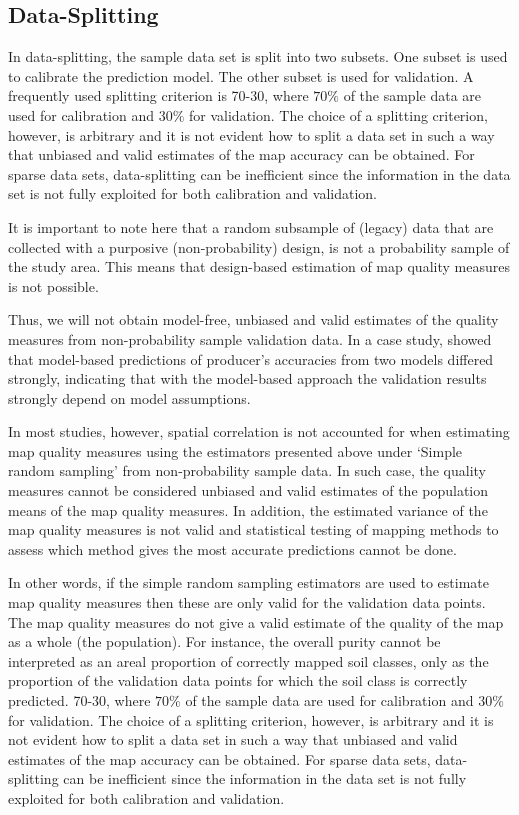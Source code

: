 \documentclass[10pt,b5paper,]{book}
\theoremstyle{definition}
\theoremstyle{definition}
\theoremstyle{definition}
\theoremstyle{remark}
\begin{document}
\hypertarget{data-splitting}{%
\subsection{Data-Splitting}\label{data-splitting}}

In data-splitting, the sample data set is split into two subsets. One
subset is used to calibrate the prediction model. The other subset is
used for validation. A frequently used splitting criterion is 70-30,
where \(70\%\) of the sample data are used for calibration and \(30\%\)
for validation. The choice of a splitting criterion, however, is
arbitrary and it is not evident how to split a data set in such a way
that unbiased and valid estimates of the map accuracy can be obtained.
For sparse data sets, data-splitting can be inefficient since the
information in the data set is not fully exploited for both calibration
and validation.

It is important to note here that a random subsample of (legacy) data
that are collected with a purposive (non-probability) design, is not a
probability sample of the study area. This means that design-based
estimation of map quality measures is not possible.

Thus, we will not obtain model-free, unbiased and valid estimates of the
quality measures from non-probability sample validation data. In a case
study, \citet{knotters2013purposive} showed that model-based predictions
of producer's accuracies from two models differed strongly, indicating
that with the model-based approach the validation results strongly
depend on model assumptions.

In most studies, however, spatial correlation is not accounted for when
estimating map quality measures using the estimators presented above
under `Simple random sampling' from non-probability sample data. In such
case, the quality measures cannot be considered unbiased and valid
estimates of the population means of the map quality measures. In
addition, the estimated variance of the map quality measures is not
valid and statistical testing of mapping methods to assess which method
gives the most accurate predictions cannot be done.

In other words, if the simple random sampling estimators are used to
estimate map quality measures then these are only valid for the
validation data points. The map quality measures do not give a valid
estimate of the quality of the map as a whole (the population). For
instance, the overall purity cannot be interpreted as an areal
proportion of correctly mapped soil classes, only as the proportion of
the validation data points for which the soil class is correctly
predicted. 70-30, where \(70\%\) of the sample data are used for
calibration and \(30\%\) for validation. The choice of a splitting
criterion, however, is arbitrary and it is not evident how to split a
data set in such a way that unbiased and valid estimates of the map
accuracy can be obtained. For sparse data sets, data-splitting can be
inefficient since the information in the data set is not fully exploited
for both calibration and validation.
\end{document}
